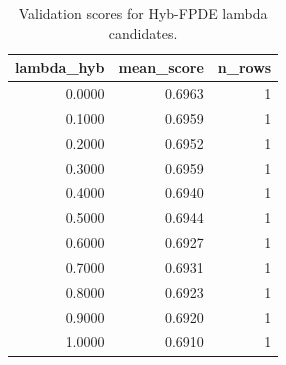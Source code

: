\begin{table}[t]
\caption{Validation scores for Hyb-FPDE lambda candidates.}
\label{tab:lambda_distribution_computed}
\centering
\begin{tabular}{rrr}
\toprule
lambda\_hyb & mean\_score & n\_rows \\
\midrule
0.0000 & 0.6963 & 1 \\
0.1000 & 0.6959 & 1 \\
0.2000 & 0.6952 & 1 \\
0.3000 & 0.6959 & 1 \\
0.4000 & 0.6940 & 1 \\
0.5000 & 0.6944 & 1 \\
0.6000 & 0.6927 & 1 \\
0.7000 & 0.6931 & 1 \\
0.8000 & 0.6923 & 1 \\
0.9000 & 0.6920 & 1 \\
1.0000 & 0.6910 & 1 \\
\bottomrule
\end{tabular}

\end{table}
